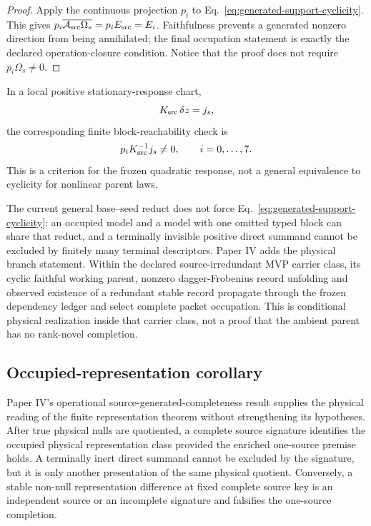 \documentclass[11pt]{article}
\begin{document}
\begin{proof}
Apply the continuous projection \(p_i\) to
Eq.~\eqref{eq:generated-support-cyclicity}. This gives
\(p_i\overline{\mathcal A_{\rm src}\Omega_s}=p_iE_{\rm src}=E_i\).
Faithfulness prevents a generated nonzero direction from being annihilated;
the final occupation statement is exactly the declared operation-closure
condition. Notice that the proof does not require \(p_i\Omega_s\ne0\).
\end{proof}

In a local positive stationary-response chart,
\begin{equation}
 K_{\rm src}\,\delta z=j_s,
\end{equation}
the corresponding finite block-reachability check is
\begin{equation}
 p_iK_{\rm src}^{-1}j_s\ne0,
 \qquad i=0,\ldots,7.
 \label{eq:local-block-reachability}
\end{equation}
This is a criterion for the frozen quadratic response, not a general
equivalence to cyclicity for nonlinear parent laws.

The current general base--seed reduct does not force
Eq.~\eqref{eq:generated-support-cyclicity}: an occupied model and a model with
one omitted typed block can share that reduct, and a terminally invisible
positive direct summand cannot be excluded by finitely many terminal
descriptors. Paper IV adds the physical branch statement. Within the declared
source-irredundant MVP carrier class, its cyclic faithful working parent,
nonzero dagger-Frobenius record unfolding and observed existence of a redundant
stable record propagate through the frozen dependency ledger and select
complete packet occupation. This is conditional physical realization inside
that carrier class, not a proof that the ambient parent has no rank-novel
completion.

\subsection{Occupied-representation corollary}

Paper IV's operational source-generated-completeness result supplies the
physical reading of the finite representation theorem without strengthening
its hypotheses. After true physical nulls are quotiented, a complete source
signature identifies the occupied physical representation class provided the
enriched one-source premise holds. A terminally inert direct summand cannot be
excluded by the signature, but it is only another presentation of the same
physical quotient. Conversely, a stable non-null representation difference
at fixed complete source key is an independent source or an incomplete
signature and falsifies the one-source completion.
\end{document}
